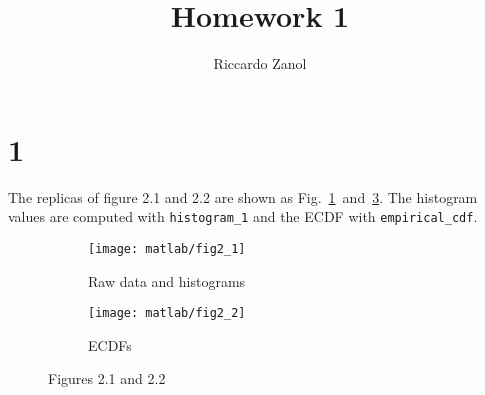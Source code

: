 \documentclass{article}
\author{Riccardo Zanol}
\title{Homework 1}
\newcommand{\inlinecode}[1]{\lstinline[basicstyle=\ttfamily,keywordstyle={}]{#1}}
\begin{document}
\maketitle
\section*{1}
The replicas of figure 2.1 and 2.2 are shown as
Fig.~\ref{plot_2_1}~and~\ref{plot_2_2}. The histogram values are
computed with \inlinecode{histogram_1} and the ECDF with
\inlinecode{empirical_cdf}.
\begin{figure}[htbp]
  \centering
  \begin{subfigure}{0.5\textwidth}
    \centering
    \texttt{[image: matlab/fig2\_1]}
    \caption{Raw data and histograms}
    \label{plot_2_1}
  \end{subfigure}%
  \begin{subfigure}{0.5\textwidth}
    \centering
    \texttt{[image: matlab/fig2\_2]}
    \caption{ECDFs}
    \label{plot_2_2}
  \end{subfigure}
  \caption{Figures 2.1 and 2.2}
\end{figure}
\end{document}
